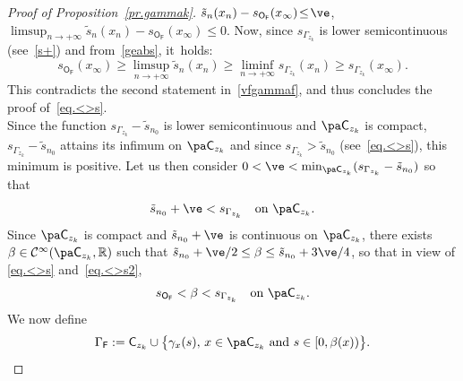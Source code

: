 \begin{proof}[Proof of Proposition~\ref{pr.gammak}]
\hbox{$ \tilde s_{n}(x_n)-\nobreak s_{\mathsf O_{\mathsf F}}(x_{\infty})\!\le\! \ve$}, \ie $\limsup_{n\to +\infty} \tilde s_{n}(x_n)- s_{\mathsf O_{\mathsf F}}(x_{\infty})\le 0$. Now, since $s_{\Gamma_{z_k}}$ is lower semicontinuous (see~\eqref{s+}) and from~\eqref{geabs}, it~holds:
\[
s_{\mathsf O_{\mathsf F}}(x_{\infty})\ge \limsup_{n\to +\infty} \tilde s_{n}(x_n) \ge \liminf_{n\to +\infty} s_{\Gamma_{z_k}}(x_n)\ge s_{\Gamma_{z_k}}(x_\infty).
\]
This contradicts the second statement in~\eqref{vfgammaf}, and thus concludes the proof of~\eqref{eq.<>s}. \\
Since the function $s_{\Gamma_{z_k}}-\tilde s_{n_0}$ is lower semicontinuous and $\pa \mathsf C_{z_k}$ is compact, $s_{\Gamma_{z_k}}-\tilde s_{n_0}$ attains its infimum on $\pa \mathsf C_{z_k}$ and since $ s_{\Gamma_{z_k}}>\tilde s_{n_0}$ (see~\eqref{eq.<>s}), this minimum is positive. Let us then consider $0<\ve<\min_{\pa \mathsf C_{z_k}} (s_{\Gamma_{z_k}}-\tilde s_{n_0})$ so that
\begin{equation}\label{eq.<>s2}
\tilde s_{n_0} +\ve < s_{\Gamma_{z_k}} \quad \text{on } \pa \mathsf C_{z_k}.
\end{equation}
Since
$ \pa \mathsf C_{z_k}$ is compact and $ \tilde s_{n_0} +\ve$ is continuous on $ \pa \mathsf C_{z_k}$, there exists $\beta \in \mathcal C^\infty(\pa \mathsf C_{z_k},\mathbb R)$ such that $ \tilde s_{n_0} +\ve /2\le \beta \le \tilde s_{n_0} + {3\ve}/{4}$, so that in view of \eqref{eq.<>s} and~\eqref{eq.<>s2},
\begin{equation}\label{eq.betas}
s_{\mathsf O_{\mathsf F}} < \beta <s_{\Gamma_{z_k}} \quad \text{on } \pa \mathsf C_{z_k}.
\end{equation}
We now define
\begin{equation}\label{F}
\Gamma_{\mathsf F}:= \mathsf C_{z_k} \cup \big \{ \gamma_x(s), \, x\in \pa \mathsf C_{z_k} \text{ and } s\in [0,\beta(x))\big \}.
\end{equation}


\end{proof}
